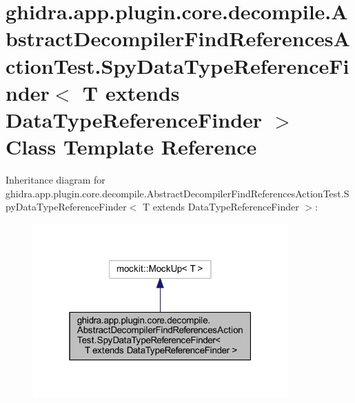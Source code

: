 \hypertarget{classghidra_1_1app_1_1plugin_1_1core_1_1decompile_1_1_abstract_decompiler_find_references_action62f1da74789936d35e783df474af1e76}{}\section{ghidra.\+app.\+plugin.\+core.\+decompile.\+Abstract\+Decompiler\+Find\+References\+Action\+Test.\+Spy\+Data\+Type\+Reference\+Finder$<$ T extends Data\+Type\+Reference\+Finder $>$ Class Template Reference}
\label{classghidra_1_1app_1_1plugin_1_1core_1_1decompile_1_1_abstract_decompiler_find_references_action62f1da74789936d35e783df474af1e76}


Inheritance diagram for ghidra.\+app.\+plugin.\+core.\+decompile.\+Abstract\+Decompiler\+Find\+References\+Action\+Test.\+Spy\+Data\+Type\+Reference\+Finder$<$ T extends Data\+Type\+Reference\+Finder $>$\+:
\nopagebreak
\begin{figure}[H]
\begin{center}
\leavevmode
\includegraphics[width=277pt]{classghidra_1_1app_1_1plugin_1_1core_1_1decompile_1_1_abstract_decompiler_find_references_action520030633019bfa98050d4aab382f123}
\end{center}
\end{figure}


